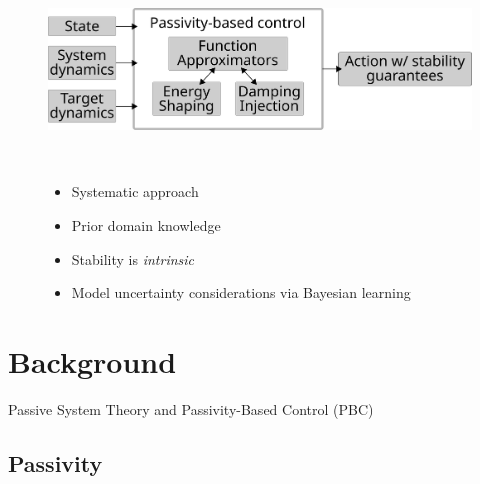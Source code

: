 \documentclass[
]{report}
\providecommand{\tightlist}{%
  \setlength{\itemsep}{0pt}\setlength{\parskip}{0pt}}\usepackage{longtable,booktabs,array}
\begin{document}
\begin{figure}

\begin{minipage}[c]{0.61\linewidth}

{\centering 

\includegraphics{contents/assets/pbc-ml-outline.svg}

}

\end{minipage}%
%
\begin{minipage}[c]{0.03\linewidth}

{\centering 

~

}

\end{minipage}%
%
\begin{minipage}[c]{0.36\linewidth}

{\centering 

\begin{itemize}
\tightlist
\item
  Systematic approach
\item
  Prior domain knowledge
\item
  Stability is \emph{intrinsic}
\item
  Model uncertainty considerations via Bayesian learning
\end{itemize}

}

\end{minipage}%

\end{figure}

\hypertarget{background}{%
\chapter{Background}\label{background}}

Passive System Theory and Passivity-Based Control (PBC)

\hypertarget{passivity}{%
\section{Passivity}\label{passivity}}
\end{document}
